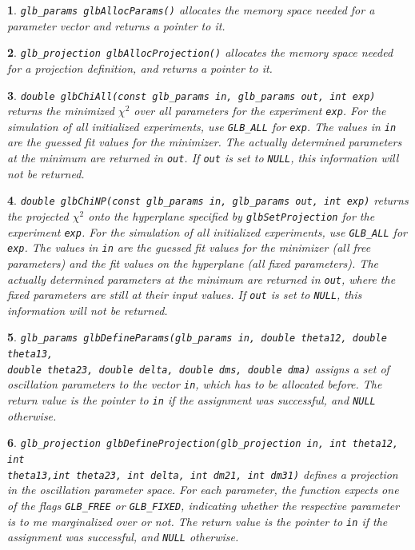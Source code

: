 \documentclass[12pt,a4paper]{article}
\theoremstyle{dotless}
\newtheorem*{function}{}
\begin{document}
\begin{function}
{\tt glb\_params glbAllocParams()} allocates the memory space
needed for a parameter vector and returns a pointer to it.
\end{function}

\begin{function}
{\tt glb\_projection glbAllocProjection()} allocates the memory space
needed for a projection definition, and returns a pointer to it.
\end{function}

\begin{function}
{\tt double glbChiAll(const glb\_params in, glb\_params out, int exp)}
returns the minimized $\chi^2$ over all parameters for the experiment
{\tt exp}. For the simulation of all initialized experiments, use
{\tt GLB\_ALL} for {\tt exp}. The values in {\tt in} are the guessed
fit values for the minimizer. The actually determined parameters at
the minimum are returned in {\tt out}. If {\tt out} is set to {\tt NULL},
this information will not be returned.
\end{function}

\begin{function}
{\tt double glbChiNP(const glb\_params in, glb\_params out, int exp)}
returns the projected $\chi^2$ onto the hyperplane specified by
{\tt glbSetProjection} for the  experiment {\tt exp}.
For the simulation of all initialized experiments,
use {\tt GLB\_ALL} for {\tt exp}. The values in {\tt in} are the guessed
fit values for the minimizer (all free parameters) and the fit values
on the hyperplane (all fixed parameters). The actually determined parameters
at the minimum are returned in {\tt out}, where the fixed parameters are
still at their input values. If {\tt out} is set to {\tt NULL}, this
information will not be returned.
\end{function}

\begin{function}
{\tt glb\_params glbDefineParams(glb\_params in, double theta12, double
theta13, \\ double theta23, double delta, double dms, double dma)}
assigns a set of oscillation parameters to the vector {\tt in}, which
has to be allocated before. The return value is the pointer to {\tt in}
if the assignment was successful, and {\tt NULL} otherwise.
\end{function}

\begin{function}
{\tt glb\_projection glbDefineProjection(glb\_projection in, int theta12,
int \\ theta13,int theta23, int delta, int dm21, int dm31)} defines a
projection in the oscillation parameter space. For each parameter,
the function expects one of the flags {\tt GLB\_FREE} or {\tt GLB\_FIXED},
indicating whether the respective parameter is to me marginalized over
or not. The return value is the pointer to {\tt in} if
the assignment was successful, and {\tt NULL} otherwise.
\end{function}
\end{document}
